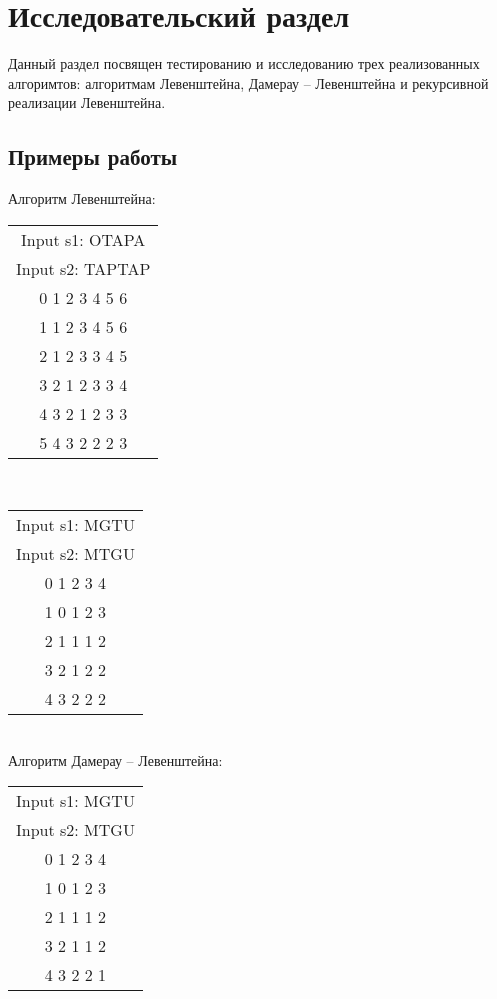 \chapter{Исследовательский раздел}
Данный раздел посвящен тестированию и исследованию трех реализованных алгоримтов: алгоритмам Левенштейна, Дамерау -- Левенштейна и рекурсивной реализации Левенштейна.

\section{ Примеры работы}
Алгоритм Левенштейна:

\begin{tabular}{c}
Input s1: OTAPA\\
Input s2: TAPTAP\\

0 1 2 3 4 5 6\\
1 1 2 3 4 5 6\\
2 1 2 3 3 4 5\\
3 2 1 2 3 3 4\\
4 3 2 1 2 3 3\\
5 4 3 2 2 2 3\\
\end{tabular}\\


\begin{tabular}{c}
Input s1: MGTU\\
Input s2: MTGU\\

0 1 2 3 4 \\ 
1 0 1 2 3\\
2 1 1 1 2\\
3 2 1 2 2\\
4 3 2 2 2\\
\end{tabular}\\

Алгоритм Дамерау -- Левенштейна:

\begin{tabular}{c}
Input s1: MGTU \\ 
Input s2: MTGU\\

0 1 2 3 4\\
1 0 1 2 3\\
2 1 1 1 2\\
3 2 1 1 2\\
4 3 2 2 1\\
\end{tabular}\\

